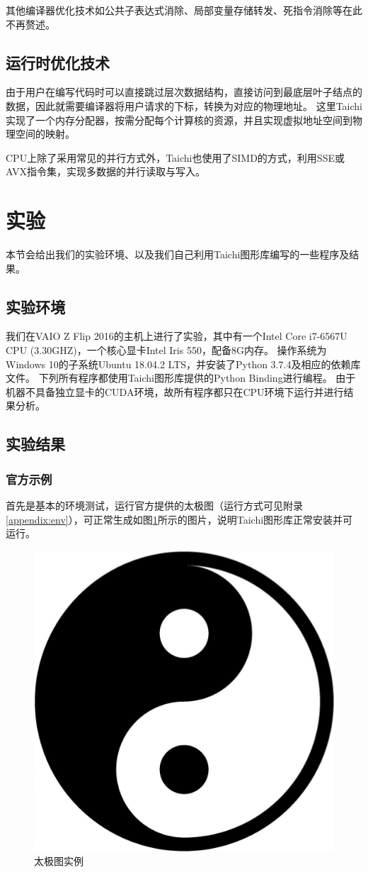 \documentclass[thesis]{thesis}
\begin{document}
其他编译器优化技术如公共子表达式消除、局部变量存储转发、死指令消除等在此不再赘述。

\subsection{运行时优化技术}
由于用户在编写代码时可以直接跳过层次数据结构，直接访问到最底层叶子结点的数据，因此就需要编译器将用户请求的下标，转换为对应的物理地址。
这里Taichi实现了一个内存分配器，按需分配每个计算核的资源，并且实现虚拟地址空间到物理空间的映射。

CPU上除了采用常见的并行方式外，Taichi也使用了SIMD的方式，利用SSE或AVX指令集，实现多数据的并行读取与写入。

\section{实验}
\label{sec:exp}
本节会给出我们的实验环境、以及我们自己利用Taichi图形库编写的一些程序及结果。

\subsection{实验环境}
我们在VAIO Z Flip 2016的主机上进行了实验，其中有一个Intel Core i7-6567U CPU (3.30GHZ)，一个核心显卡Intel Iris 550，配备8G内存。
操作系统为Windows 10的子系统Ubuntu 18.04.2 LTS，并安装了Python 3.7.4及相应的依赖库文件。
下列所有程序都使用Taichi图形库提供的Python Binding进行编程。
由于机器不具备独立显卡的CUDA环境，故所有程序都只在CPU环境下运行并进行结果分析。

\subsection{实验结果}
\subsubsection{官方示例}
首先是基本的环境测试，运行官方提供的太极图（运行方式可见附录\ref{appendix:env}），可正常生成如图\ref{fig:taichi}所示的图片，说明Taichi图形库正常安装并可运行。
\begin{figure}[htbp]
\centering
\includegraphics[width=0.3\linewidth]{fig/taichi.jpg}
\caption{太极图实例\protect\footnotemark}
\label{fig:taichi}
\end{figure}
\end{document}
